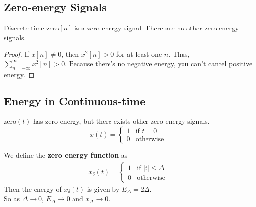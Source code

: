 \chapter{}

\section{Zero-energy Signals}

\begin{claim}
    Discrete-time $\text{zero}[n]$ is a zero-energy signal. There are no other zero-energy signals.
\end{claim}

\begin{proof}
    If $x[n] \neq 0$, then $x^2[n] > 0$ for at least one $n$. Thus, $\sum_{n=-\infty}^{\infty} x^2[n] > 0$. Because there's no negative energy, you can't cancel positive energy.
\end{proof}

\section{Energy in Continuous-time}

\begin{claim}
    $\text{zero}(t)$ has zero energy, but there exists other zero-energy signals.
    \[
        x(t) = \begin{cases}
            1 & \text{if } t = 0 \\
            0 & \text{otherwise}
        \end{cases}
    \]
\end{claim}


\begin{definition}
    We define the \textbf{zero energy function} as
    \begin{align*}
        x_\delta(t) = \begin{cases}
                          1 & \text{if } |t| \leq \Delta \\
                          0 & \text{otherwise}
                      \end{cases}
    \end{align*}
    Then the energy of $x_\delta(t)$ is given by $E_\Delta = 2\Delta$. \\
    So as $\Delta \to 0$, $E_\Delta \to 0$ and $x_\Delta \to 0$.
\end{definition}

